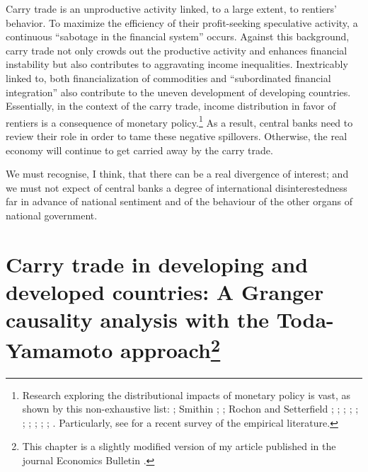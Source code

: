 \documentclass[a4paper, twoside]{templates/ociamthesis}
\begin{document}
Carry trade is an unproductive activity linked, to a large extent, to rentiers' behavior. To maximize the efficiency of their profit-seeking speculative activity, a continuous ``sabotage in the financial system'' \autocite{nesvetailova2020} occurs. Against this background, carry trade not only crowds out the productive activity and enhances financial instability but also contributes to aggravating income inequalities. Inextricably linked to, both financialization of commodities \autocite{basak2016,caldentey2020} and ``subordinated financial integration'' \autocite{kaltenbrunner2018a} also contribute to the uneven development of developing countries. Essentially, in the context of the carry trade, income distribution in favor of rentiers is a consequence of monetary policy.\footnote{Research exploring the distributional impacts of monetary policy is vast, as shown by this non-exhaustive list: \textcite{moore1990}; Smithin \autocite*{smithin1996,smithin2020}; \textcite{thorbecke2001}; Rochon and Setterfield \autocite*{rochon2007,rochon2008,rochon2012}; \textcite{seccareccia2016}; \textcite{seccareccia2017}; \textcite{davtyan2017}; \textcite{guerello2018}; \textcite{casiraghi2018}; \textcite{rochon2021}; \textcite{holm2021}; \textcite{bonifacio2021}; \textcite{amberg2021}; \textcite{ybrayev2021}. Particularly, see \textcite{kappes2021} for a recent survey of the empirical literature.} As a result, central banks need to review their role in order to tame these negative spillovers. Otherwise, the real economy will continue to get carried away by the carry trade.

\begin{savequote}
We must recognise, I think, that there can be a real divergence of
interest; and we must not expect of central banks a degree of
international disinterestedness far in advance of national sentiment and
of the behaviour of the other organs of national government.
\end{savequote}



\hypertarget{three}{%
\chapter[Carry trade in developing and developed countries: A Granger causality analysis with the Toda-Yamamoto approach]{\texorpdfstring{Carry trade in developing and developed countries: A Granger causality analysis with the Toda-Yamamoto approach\footnote{This chapter is a slightly modified version of my article published in the journal Economics Bulletin \autocite[see][]{tomio2020}.}}{Carry trade in developing and developed countries: A Granger causality analysis with the Toda-Yamamoto approach}}\label{three}}
\end{document}
